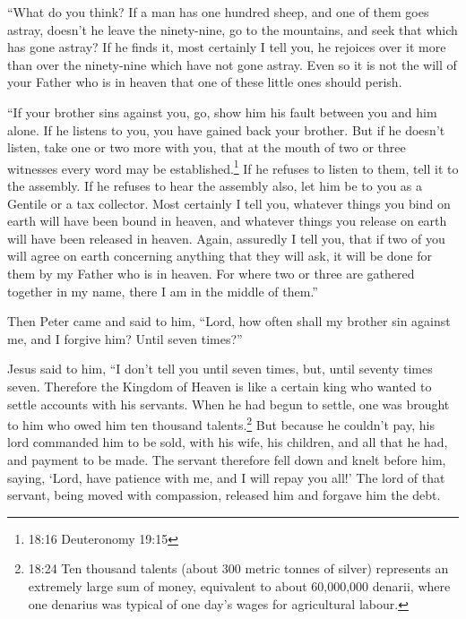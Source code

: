  ``What do you think? If a man has one hundred sheep, and
one of them goes astray, doesn't he leave the ninety-nine, go to the
mountains, and seek that which has gone astray?  If he
finds it, most certainly I tell you, he rejoices over it more than over
the ninety-nine which have not gone astray.  Even so it is
not the will of your Father who is in heaven that one of these little
ones should perish.

 ``If your brother sins against you, go, show him his fault
between you and him alone. If he listens to you, you have gained back
your brother.  But if he doesn't listen, take one or two
more with you, that at the mouth of two or three witnesses every word
may be established.\footnote{18:16 Deuteronomy 19:15}  If
he refuses to listen to them, tell it to the assembly. If he refuses to
hear the assembly also, let him be to you as a Gentile or a tax
collector.  Most certainly I tell you, whatever things you
bind on earth will have been bound in heaven, and whatever things you
release on earth will have been released in heaven.  Again,
assuredly I tell you, that if two of you will agree on earth concerning
anything that they will ask, it will be done for them by my Father who
is in heaven.  For where two or three are gathered together
in my name, there I am in the middle of them.''

 Then Peter came and said to him, ``Lord, how often shall
my brother sin against me, and I forgive him? Until seven times?''

 Jesus said to him, ``I don't tell you until seven times,
but, until seventy times seven.  Therefore the Kingdom of
Heaven is like a certain king who wanted to settle accounts with his
servants.  When he had begun to settle, one was brought to
him who owed him ten thousand talents.\footnote{18:24 Ten thousand
  talents (about 300 metric tonnes of silver) represents an extremely
  large sum of money, equivalent to about 60,000,000 denarii, where one
  denarius was typical of one day's wages for agricultural labour.}
 But because he couldn't pay, his lord commanded him to be
sold, with his wife, his children, and all that he had, and payment to
be made.  The servant therefore fell down and knelt before
him, saying, `Lord, have patience with me, and I will repay you all!'
 The lord of that servant, being moved with compassion,
released him and forgave him the debt.

